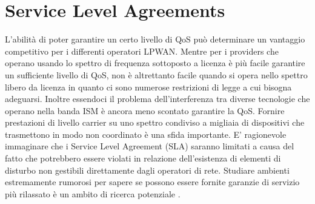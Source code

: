 \documentclass[12pt,a4paper,openright,twoside]{report}
\begin{document}
\section{Service Level Agreements}
L'abilit\`a di poter garantire un certo livello di QoS pu\`o determinare un vantaggio competitivo per i differenti operatori LPWAN.					
Mentre per i providers che operano usando lo spettro di frequenza sottoposto a licenza \`e pi\`u facile garantire un sufficiente livello di QoS, non \`e altrettanto facile quando si opera nello spettro libero da licenza in quanto ci sono numerose restrizioni di legge a cui bisogna adeguarsi. 
Inoltre essendoci il problema dell'interferenza tra diverse tecnologie che operano nella banda ISM \`e ancora meno scontato garantire la QoS. 
Fornire prestazioni di livello carrier su uno spettro condiviso a migliaia di dispositivi che trasmettono in modo non coordinato \`e una sfida importante. E' ragionevole immaginare che i Service Level Agreement (SLA) saranno limitati a causa del fatto che potrebbero essere violati in relazione dell'esistenza di elementi di disturbo non gestibili direttamente dagli operatori di rete.   
Studiare ambienti estremamente rumorosi per sapere se possono essere fornite garanzie di servizio pi\`u rilassato \`e un ambito di ricerca potenziale \cite{K2}.
\end{document}

